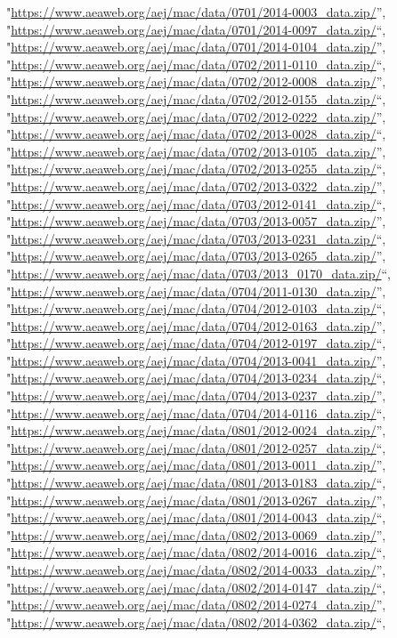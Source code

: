 \documentclass[]{article}
\begin{document}
\begin{itemize}
  "\url{https://www.aeaweb.org/aej/mac/data/0701/2014-0003_data.zip/}'',
  "\url{https://www.aeaweb.org/aej/mac/data/0701/2014-0097_data.zip/}``,
  "\url{https://www.aeaweb.org/aej/mac/data/0701/2014-0104_data.zip/}'',
  "\url{https://www.aeaweb.org/aej/mac/data/0702/2011-0110_data.zip/}``,
  "\url{https://www.aeaweb.org/aej/mac/data/0702/2012-0008_data.zip/}'',
  "\url{https://www.aeaweb.org/aej/mac/data/0702/2012-0155_data.zip/}``,
  "\url{https://www.aeaweb.org/aej/mac/data/0702/2012-0222_data.zip/}'',
  "\url{https://www.aeaweb.org/aej/mac/data/0702/2013-0028_data.zip/}``,
  "\url{https://www.aeaweb.org/aej/mac/data/0702/2013-0105_data.zip/}'',
  "\url{https://www.aeaweb.org/aej/mac/data/0702/2013-0255_data.zip/}``,
  "\url{https://www.aeaweb.org/aej/mac/data/0702/2013-0322_data.zip/}'',
  "\url{https://www.aeaweb.org/aej/mac/data/0703/2012-0141_data.zip/}``,
  "\url{https://www.aeaweb.org/aej/mac/data/0703/2013-0057_data.zip/}'',
  "\url{https://www.aeaweb.org/aej/mac/data/0703/2013-0231_data.zip/}``,
  "\url{https://www.aeaweb.org/aej/mac/data/0703/2013-0265_data.zip/}'',
  "\url{https://www.aeaweb.org/aej/mac/data/0703/2013_0170_data.zip/}``,
  "\url{https://www.aeaweb.org/aej/mac/data/0704/2011-0130_data.zip/}'',
  "\url{https://www.aeaweb.org/aej/mac/data/0704/2012-0103_data.zip/}``,
  "\url{https://www.aeaweb.org/aej/mac/data/0704/2012-0163_data.zip/}'',
  "\url{https://www.aeaweb.org/aej/mac/data/0704/2012-0197_data.zip/}``,
  "\url{https://www.aeaweb.org/aej/mac/data/0704/2013-0041_data.zip/}'',
  "\url{https://www.aeaweb.org/aej/mac/data/0704/2013-0234_data.zip/}``,
  "\url{https://www.aeaweb.org/aej/mac/data/0704/2013-0237_data.zip/}'',
  "\url{https://www.aeaweb.org/aej/mac/data/0704/2014-0116_data.zip/}``,
  "\url{https://www.aeaweb.org/aej/mac/data/0801/2012-0024_data.zip/}'',
  "\url{https://www.aeaweb.org/aej/mac/data/0801/2012-0257_data.zip/}``,
  "\url{https://www.aeaweb.org/aej/mac/data/0801/2013-0011_data.zip/}'',
  "\url{https://www.aeaweb.org/aej/mac/data/0801/2013-0183_data.zip/}``,
  "\url{https://www.aeaweb.org/aej/mac/data/0801/2013-0267_data.zip/}'',
  "\url{https://www.aeaweb.org/aej/mac/data/0801/2014-0043_data.zip/}``,
  "\url{https://www.aeaweb.org/aej/mac/data/0802/2013-0069_data.zip/}'',
  "\url{https://www.aeaweb.org/aej/mac/data/0802/2014-0016_data.zip/}``,
  "\url{https://www.aeaweb.org/aej/mac/data/0802/2014-0033_data.zip/}'',
  "\url{https://www.aeaweb.org/aej/mac/data/0802/2014-0147_data.zip/}``,
  "\url{https://www.aeaweb.org/aej/mac/data/0802/2014-0274_data.zip/}'',
  "\url{https://www.aeaweb.org/aej/mac/data/0802/2014-0362_data.zip/}``,

\end{itemize}
\end{document}

